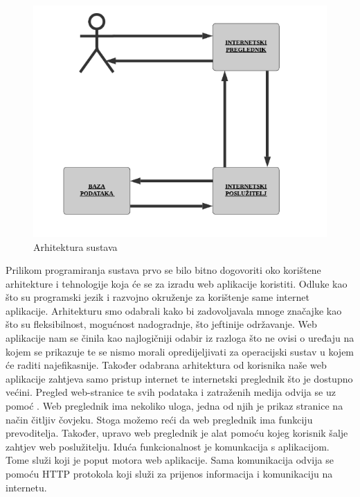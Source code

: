 	\begin{figure}[H]
			\includegraphics[scale=1.0]{slike/arh.PNG} %
			\centering
			\caption{Arhitektura sustava}
			\label{fig:promjene}
		\end{figure}
	Prilikom programiranja sustava prvo se bilo bitno dogovoriti oko korištene arhitekture i tehnologije koja će se za izradu web aplikacije koristiti. Odluke kao što su programski jezik i razvojno okruženje za korištenje same internet aplikacije. Arhitekturu smo odabrali kako bi zadovoljavala mnoge značajke kao što su fleksibilnost, mogućnost nadogradnje, što jeftinije održavanje. Web aplikacije nam se činila kao najlogičniji odabir iz razloga što ne ovisi o uređaju na kojem se prikazuje te se nismo morali opredijeljivati za operacijski sustav u kojem će raditi najefikasnije. Također odabrana arhitektura od korisnika naše web aplikacije zahtjeva samo pristup internet te internetski preglednik što je dostupno većini.  \newline
	\indent Pregled web-stranice te svih podataka i zatraženih medija odvija se uz pomoć . Web preglednik ima nekoliko uloga, jedna od njih je prikaz stranice na način čitljiv čovjeku. Stoga možemo reći da web preglednik ima funkciju prevoditelja. Također, upravo web preglednik je alat pomoću kojeg korisnik šalje zahtjev web poslužitelju. \newline
	\indent Iduća funkcionalnost je komunkacija s aplikacijom. Tome služi  koji je poput motora web aplikacije. Sama komunikacija odvija se pomoću HTTP protokola koji služi za prijenos informacija i komunikaciju na internetu. \newline
